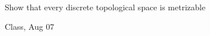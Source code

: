 \begin{samepage}
\begin{ex}
Show that every discrete topological space is metrizable
\end{ex}
\begin{source}
Class, Aug 07
\end{source}
\end{samepage}

